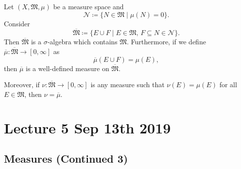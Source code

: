 \documentclass[notoc,notitlepage]{tufte-book}
\begin{document}
\begin{thm}\label{thm:extending_the_measurable_sets}
  Let $(X, \mathfrak{M}, \mu)$ be a measure space and
  \begin{equation*}
    \mathcal{N} \coloneqq \{ N \in \mathfrak{M} \mid \mu(N) = 0 \}.
  \end{equation*}
  Consider
  \begin{equation*}
    \overline{\mathfrak{M}} \coloneqq \{ E \cup F
      \mid E \in \mathfrak{M},\, F \subseteq N \in \mathcal{N} \}.
  \end{equation*}
  Then $\overline{\mathfrak{M}}$ is a $\sigma$-algebra
  which contains $\mathfrak{M}$.
  Furthermore, if we define $\overline{\mu}
  : \overline{\mathfrak{M}} \to [0, \infty]$ as
  \begin{equation*}
    \overline{\mu}(E \cup F) = \mu(E),
  \end{equation*}
  then $\overline{\mu}$ is a well-defined measure on $\overline{\mathfrak{M}}$.

  Moreover, if $\nu : \overline{\mathfrak{M}} \to [0, \infty]$ is any measure
  such that $\nu(E) = \mu(E)$ for all $E \in \mathfrak{M}$, then
  $\nu = \overline{\mu}$.
\end{thm}



\chapter{Lecture 5 Sep 13th 2019}%
\label{chp:lecture_5_sep_13th_2019}

\section{Measures (Continued 3)}%
\label{sec:measures_continued_3}
\end{document}
